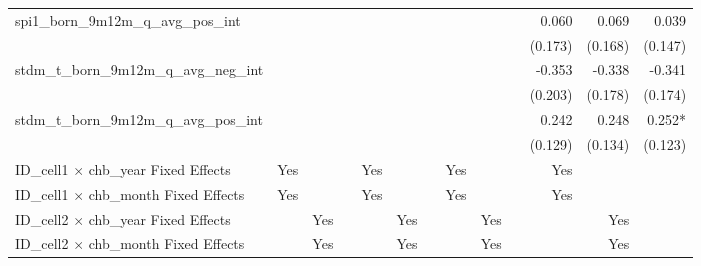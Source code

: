 \begin{tabular}{lrrrrrrrrrrrr}
spi1\_born\_9m12m\_q\_avg\_pos\_int         &              &              &              &              &              &              &              &              &              &        0.060 &        0.069 &        0.039 \\ 
                                            &              &              &              &              &              &              &              &              &              &      (0.173) &      (0.168) &      (0.147) \\ 
stdm\_t\_born\_9m12m\_q\_avg\_neg\_int      &              &              &              &              &              &              &              &              &              &       -0.353 &       -0.338 &       -0.341 \\ 
                                            &              &              &              &              &              &              &              &              &              &      (0.203) &      (0.178) &      (0.174) \\ 
stdm\_t\_born\_9m12m\_q\_avg\_pos\_int      &              &              &              &              &              &              &              &              &              &        0.242 &        0.248 &       0.252* \\ 
                                            &              &              &              &              &              &              &              &              &              &      (0.129) &      (0.134) &      (0.123) \\ 
\midrule
ID\_cell1 $\times$ chb\_year Fixed Effects  &          Yes &              &              &          Yes &              &              &          Yes &              &              &          Yes &              &              \\ 
ID\_cell1 $\times$ chb\_month Fixed Effects &          Yes &              &              &          Yes &              &              &          Yes &              &              &          Yes &              &              \\ 
ID\_cell2 $\times$ chb\_year Fixed Effects  &              &          Yes &              &              &          Yes &              &              &          Yes &              &              &          Yes &              \\ 
ID\_cell2 $\times$ chb\_month Fixed Effects &              &          Yes &              &              &          Yes &              &              &          Yes &              &              &          Yes &              \\ 

\end{tabular}
